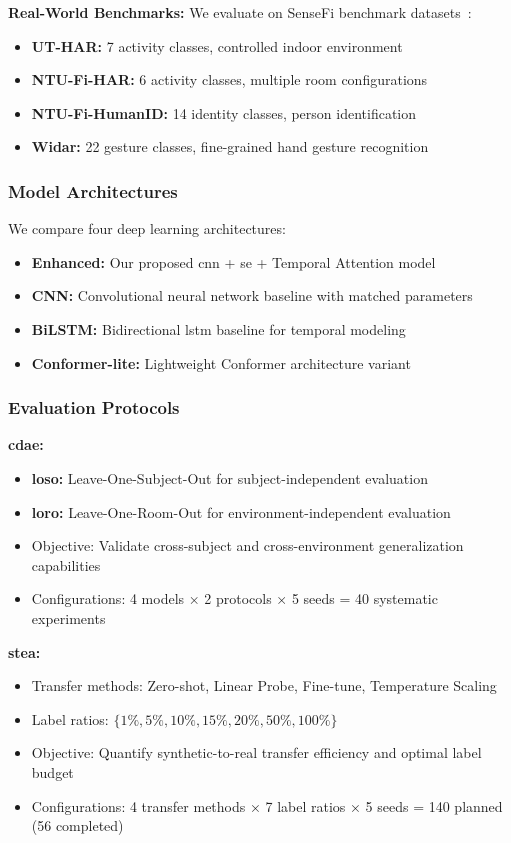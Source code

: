 \documentclass[journal]{IEEEtran}
\begin{document}
\textbf{Real-World Benchmarks:} We evaluate on SenseFi benchmark datasets~\cite{yang2023sensefi}:
\begin{itemize}
\item \textbf{UT-HAR:} 7 activity classes, controlled indoor environment
\item \textbf{NTU-Fi-HAR:} 6 activity classes, multiple room configurations
\item \textbf{NTU-Fi-HumanID:} 14 identity classes, person identification
\item \textbf{Widar:} 22 gesture classes, fine-grained hand gesture recognition
\end{itemize}

\subsubsection{Model Architectures}

We compare four deep learning architectures:
\begin{itemize}
\item \textbf{Enhanced:} Our proposed \gls{cnn} + \gls{se} + Temporal Attention model
\item \textbf{CNN:} Convolutional neural network baseline with matched parameters
\item \textbf{BiLSTM:} Bidirectional \gls{lstm} baseline for temporal modeling
\item \textbf{Conformer-lite:} Lightweight Conformer architecture variant
\end{itemize}

\subsubsection{Evaluation Protocols}

\textbf{\gls{cdae}:}
\begin{itemize}
\item \textbf{\gls{loso}:} Leave-One-Subject-Out for subject-independent evaluation
\item \textbf{\gls{loro}:} Leave-One-Room-Out for environment-independent evaluation
\item Objective: Validate cross-subject and cross-environment generalization capabilities
\item Configurations: 4 models × 2 protocols × 5 seeds = 40 systematic experiments
\end{itemize}

\textbf{\gls{stea}:}
\begin{itemize}
\item Transfer methods: Zero-shot, Linear Probe, Fine-tune, Temperature Scaling
\item Label ratios: $\{1\%, 5\%, 10\%, 15\%, 20\%, 50\%, 100\%\}$
\item Objective: Quantify synthetic-to-real transfer efficiency and optimal label budget
\item Configurations: 4 transfer methods × 7 label ratios × 5 seeds = 140 planned (56 completed)
\end{itemize}
\end{document}
